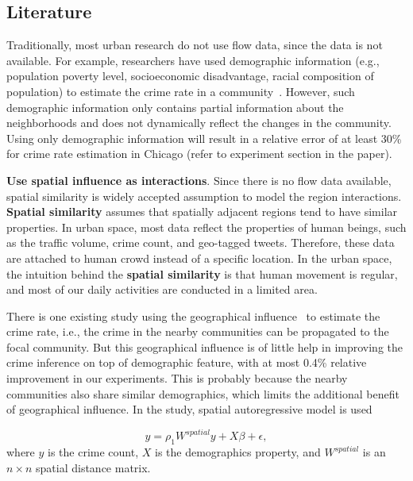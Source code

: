 \subsection{Literature}


Traditionally, most urban research  do not use flow data, since the data is not available. For example, researchers have used demographic information (e.g., population poverty level, socioeconomic disadvantage, racial composition of population) to estimate the crime rate in a community~\cite{GrSa09}. However,  such demographic information only contains partial information about the neighborhoods and does not dynamically reflect the changes in the community. Using only demographic information will result in a relative error of at least 30\% for crime rate estimation in Chicago (refer to experiment section in the paper).



\textbf{Use spatial influence as interactions}.
Since there is no flow data available, spatial similarity is widely accepted assumption to model the region interactions. \textbf{Spatial similarity} assumes that spatially adjacent regions tend to have similar properties. In urban space, most data reflect the properties of human beings, such as the traffic volume, crime count, and geo-tagged tweets. Therefore, these data are attached to human crowd instead of a specific location. 
In the urban space, the intuition behind the \textbf{spatial similarity} is that human movement is regular, and most of our daily activities are conducted in a limited area.

There is one existing study using the geographical influence~\cite{Ans02} to estimate the crime rate, i.e., the crime in the nearby communities can be propagated to the focal community. But this geographical influence is of little help in improving the crime inference on top of demographic feature, with at most 0.4\% relative improvement in our experiments. This is probably because the nearby communities also share similar demographics, which limits the additional benefit of geographical influence. In the study, spatial autoregressive model is used

\begin{equation}
\label{eq:sar}
y = \rho_1 W^{spatial} y + X \beta + \epsilon,
\end{equation}
where $y$ is the crime count, $X$ is the demographics property, and $W^{spatial}$ is an $n\times n$ spatial distance matrix.



